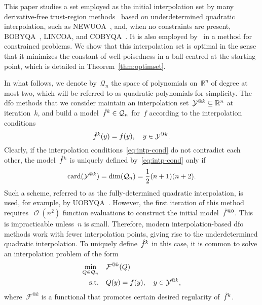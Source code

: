 \documentclass{article}
\makeatletter
\newcounter{cite}
\numberwithin{equation}{section}
\theoremstyle{definition}
\theoremstyle{plain}
\theoremstyle{remark}
\DeclareMathOperator{\bigo}{\mathcal{O}}
\DeclareMathOperator{\card}{card}
\newcommand*{\obj}{f}
\newcommand*{\objm}[1][]{\hat{\obj}\ifblank{#1}{}{^{#1}}}
\newcommand*{\R}{\mathbb{R}}
\newcommand*{\xpt}[1][]{\mathcal{Y}\ifblank{#1}{}{^{@#1}}}
\newcommand*{\qpoly}{\mathcal{Q}_n}
\makeatother
\begin{document}
This paper studies a set employed as the initial interpolation set by many derivative-free trust-region methods~\cite{Conn_Gould_Toint_2000,Yuan_2015} based on underdetermined quadratic interpolation, such as NEWUOA~\cite{Powell_2006}, and, when no constraints are present, BOBYQA~\cite{Powell_2009}, LINCOA, and COBYQA~\cite{Ragonneau_2022,Ragonneau_Zhang_2023}.
It is also employed by~\cite{Conejo_Karas_Pedroso_2015} in a method for constrained problems.
We show that this interpolation set is optimal in the sense that it minimizes the constant of well-poisedness in a ball centred at the starting point, which is detailed in Theorem~\ref{thm:optimset}.

In what follows, we denote by~$\qpoly$ the space of polynomials on~$\R^n$ of degree at most two, which will be referred to as quadratic polynomials for simplicity.
The \gls{dfo} methods that we consider maintain an interpolation set~$\xpt[k] \subseteq \R^n$ at iteration~$k$, and build a model~$\objm[k] \in \qpoly$ for~$\obj$ according to the interpolation conditions
\begin{equation}
    \label{eq:intp-cond}
    \objm[k](y) = \obj(y), \quad y \in \xpt[k].
\end{equation}
Clearly, if the interpolation conditions~\eqref{eq:intp-cond} do not contradict each other, the model~$\objm[k]$ is uniquely defined by~\eqref{eq:intp-cond} only if
\begin{equation*}
    \card(\xpt[k]) = \dim(\qpoly) = \frac{1}{2} (n + 1) (n + 2).
\end{equation*}
Such a scheme, referred to as the fully-determined quadratic interpolation, is used, for example, by UOBYQA~\cite{Powell_2002}.
However, the first iteration of this method requires~$\bigo(n^2)$ function evaluations to construct the initial model~$\objm[@0]$.
This is impracticable unless~$n$ is small.
Therefore, modern interpolation-based \gls{dfo} methods work with fewer interpolation points, giving rise to the underdetermined quadratic interpolation.
To uniquely define~$\objm[k]$ in this case, it is common to solve an interpolation problem of the form
\begin{equation}
    \label{eq:intp-var}
    \begin{aligned}
        \min_{Q \in \qpoly} & \quad \mathcal{F}^{@k}(Q)\\
        \text{s.t.}         & \quad Q(y) = \obj(y), \quad y \in \xpt[k],
    \end{aligned}
\end{equation}
where~$\mathcal{F}^{@k}$ is a functional that promotes certain desired regularity of~$\objm[k]$.
\end{document}
